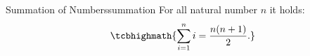 \documentclass[preview]{standalone}
\begin{document}
\begin{defn*}{Summation of Numbers}{summation}
  For all natural number $n$ it holds:
  \begin{equation}
  \tcbhighmath{\sum\limits_{i=1}^n i = \frac{n(n+1)}{2}.}
  \end{equation}
\end{defn*}
\end{document}
